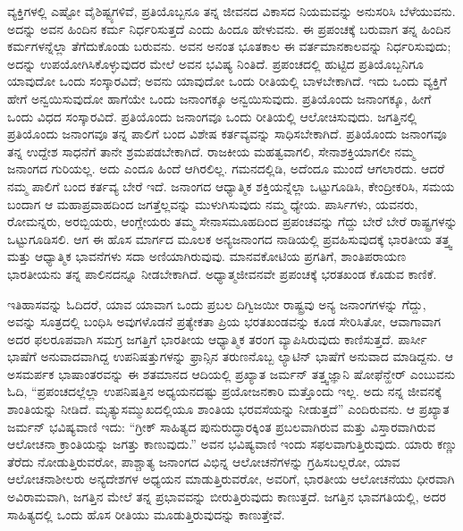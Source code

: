 ವ್ಯಕ್ತಿಗಳಲ್ಲಿ ಎಷ್ಟೋ ವೈಶಿಷ್ಟ್ಯಗಳಿವೆ, ಪ್ರತಿಯೊಬ್ಬನೂ ತನ್ನ ಜೀವನದ ವಿಕಾಸದ ನಿಯಮವನ್ನು ಅನುಸರಿಸಿ ಬೆಳೆಯುವನು. ಅದನ್ನು ಅವನ ಹಿಂದಿನ ಕರ್ಮ ನಿರ್ಧರಿಸು\-ತ್ತದೆ ಎಂದು ಹಿಂದೂ ಹೇಳುವನು. ಈ ಪ್ರಪಂಚಕ್ಕೆ ಬರುವಾಗ ತನ್ನ ಹಿಂದಿನ ಕರ್ಮಗಳನ್ನೆಲ್ಲಾ ತೆಗೆದುಕೊಂಡು ಬರುವನು. ಅವನ ಅನಂತ ಭೂತಕಾಲ ಈ ವರ್ತಮಾನಕಾಲವನ್ನು ನಿರ್ಧರಿಸುವುದು; ಅದನ್ನು ಉಪಯೋಗಿಸಿಕೊಳ್ಳುವುದರ ಮೇಲೆ ಅವನ ಭವಿಷ್ಯ ನಿಂತಿದೆ. ಪ್ರಪಂಚದಲ್ಲಿ ಹುಟ್ಟಿದ ಪ್ರತಿಯೊಬ್ಬನಿಗೂ ಯಾವುದೋ ಒಂದು ಸಂಸ್ಕಾರವಿದೆ; ಅವನು ಯಾವುದೋ ಒಂದು ರೀತಿಯಲ್ಲಿ ಬಾಳಬೇಕಾಗಿದೆ. ಇದು ಒಂದು ವ್ಯಕ್ತಿಗೆ ಹೇಗೆ ಅನ್ವಯಿಸುವುದೋ ಹಾಗೆಯೇ ಒಂದು ಜನಾಂಗಕ್ಕೂ ಅನ್ವಯಿಸುವುದು. ಪ್ರತಿಯೊಂದು ಜನಾಂಗಕ್ಕೂ, ಹೀಗೆ ಒಂದು ವಿಧದ ಸಂಸ್ಕಾರವಿದೆ. ಪ್ರತಿಯೊಂದು ಜನಾಂಗವೂ ಒಂದು ರೀತಿಯಲ್ಲಿ ಆಲೋಚಿಸುವುದು. ಜಗತ್ತಿನಲ್ಲಿ ಪ್ರತಿಯೊಂದು ಜನಾಂಗವೂ ತನ್ನ ಪಾಲಿಗೆ ಬಂದ ವಿಶೇಷ ಕರ್ತವ್ಯವನ್ನು ಸಾಧಿಸಬೇಕಾಗಿದೆ. ಪ್ರತಿಯೊಂದು ಜನಾಂಗವೂ ತನ್ನ ಉದ್ದೇಶ ಸಾಧನೆಗೆ ತಾನೇ ಶ್ರಮಪಡಬೇಕಾಗಿದೆ. ರಾಜಕೀಯ ಮಹತ್ವವಾಗಲಿ, ಸೇನಾಶಕ್ತಿಯಾಗಲೀ ನಮ್ಮ ಜನಾಂಗದ ಗುರಿಯಲ್ಲ. ಅದು ಎಂದೂ ಹಿಂದೆ ಆಗಿರಲಿಲ್ಲ. ಗಮನದಲ್ಲಿಡಿ, ಅದೆಂದೂ ಮುಂದೆ ಆಗಲಾರದು. ಆದರೆ ನಮ್ಮ ಪಾಲಿಗೆ ಬಂದ ಕರ್ತವ್ಯ ಬೇರೆ ಇದೆ. ಜನಾಂಗದ ಆಧ್ಯಾತ್ಮಿಕ ಶಕ್ತಿಯನ್ನೆಲ್ಲಾ ಒಟ್ಟುಗೂಡಿಸಿ, ಕೇಂದ್ರೀಕರಿಸಿ, ಸಮಯ ಬಂದಾಗ ಆ ಮಹಾಪ್ರವಾಹದಿಂದ ಜಗತ್ತೆಲ್ಲವನ್ನು ಮುಳುಗಿಸುವುದು ನಮ್ಮ ಧ್ಯೇಯ. ಪಾರ್ಸಿಗಳು, ಯವನರು, ರೋಮನ್ನರು, ಅರಬ್ಬಿಯರು, ಆಂಗ್ಲೇಯರು ತಮ್ಮ ಸೇನಾಸಮೂಹದಿಂದ ಪ್ರಪಂಚವನ್ನು ಗೆದ್ದು ಬೇರೆ ಬೇರೆ ರಾಷ್ಟ್ರಗಳನ್ನು ಒಟ್ಟುಗೂಡಿಸಲಿ. ಆಗ ಈ ಹೊಸ ಮಾರ್ಗದ ಮೂಲಕ ಅನ್ಯಜನಾಂಗದ ನಾಡಿಯಲ್ಲಿ ಪ್ರವಹಿಸುವುದಕ್ಕೆ ಭಾರತೀಯ ತತ್ತ್ವ ಮತ್ತು ಆಧ್ಯಾತ್ಮಿಕ ಭಾವನೆಗಳು ಸದಾ ಅಣಿಯಾಗಿರುವುವು. ಮಾನವಕೋಟಿಯ ಪ್ರಗತಿಗೆ, ಶಾಂತಿಪರಾಯಣ ಭಾರತೀಯನು ತನ್ನ ಪಾಲಿನದನ್ನೂ ನೀಡಬೇಕಾಗಿದೆ. ಅಧ್ಯಾತ್ಮಜೀವನವೇ ಪ್ರಪಂಚಕ್ಕೆ ಭರತಖಂಡ ಕೊಡುವ ಕಾಣಿಕೆ.

ಇತಿಹಾಸವನ್ನು ಓದಿದರೆ, ಯಾವ ಯಾವಾಗ ಒಂದು ಪ್ರಬಲ ದಿಗ್ವಿಜಯೀ ರಾಷ್ಟ್ರವು ಅನ್ಯ ಜನಾಂಗಗಳನ್ನು ಗೆದ್ದು, ಅವನ್ನು ಸೂತ್ರದಲ್ಲಿ ಬಂಧಿಸಿ ಅವುಗಳೊಡನೆ ಪ್ರತ್ಯೇಕತಾ ಪ್ರಿಯ ಭರತಖಂಡವನ್ನು ಕೂಡ ಸೇರಿಸಿತೋ, ಆವಾಗಾವಾಗ ಅದರ ಫಲರೂಪವಾಗಿ ಸಮಗ್ರ ಜಗತ್ತಿಗೆ ಭಾರತೀಯ ಆಧ್ಯಾತ್ಮಿಕ ತರಂಗ ವ್ಯಾಪಿಸಿರುವುದು ಕಾಣಿಸುತ್ತದೆ. ಪಾರ್ಸೀ ಭಾಷೆಗೆ ಅನುವಾದವಾಗಿದ್ದ ಉಪನಿಷತ್ತುಗಳನ್ನು ಫ್ರಾನ್ಸಿನ ತರುಣನೊಬ್ಬ ಲ್ಯಾಟಿನ್​ ಭಾಷೆಗೆ ಅನುವಾದ ಮಾಡಿದ್ದನು. ಆ ಅಸಮರ್ಪಕ ಭಾಷಾಂತರವನ್ನು ಈ ಶತಮಾನದ ಆದಿಯಲ್ಲಿ ಪ್ರಖ್ಯಾತ ಜರ್ಮನ್​ ತತ್ತ್ವಜ್ಞಾನಿ ಷೋಫೆನ್ಹೇರ್​ ಎಂಬುವನು ಓದಿ, “ಪ್ರಪಂಚದಲ್ಲೆಲ್ಲಾ ಉಪನಿಷತ್ತಿನ ಅಧ್ಯಯನದಷ್ಟು ಪ್ರಯೋಜನಕಾರಿ ಮತ್ತೊಂದು ಇಲ್ಲ. ಅದು ನನ್ನ ಜೀವನಕ್ಕೆ ಶಾಂತಿಯನ್ನು ನೀಡಿದೆ. ಮೃತ್ಯುಸಮ್ಮುಖದಲ್ಲಿಯೂ ಶಾಂತಿಯ ಭರವಸೆಯನ್ನು ನೀಡುತ್ತದೆ” ಎಂದಿರುವನು. ಆ ಪ್ರಖ್ಯಾತ ಜರ್ಮನ್​ ಭವಿಷ್ಯವಾಣಿ ಇದು: “ಗ್ರೀಕ್​ ಸಾಹಿತ್ಯದ ಪುನುರುದ್ಧಾರಕ್ಕಿಂತ ಪ್ರಬಲವಾಗಿರುವ ಮತ್ತು ವಿಸ್ತಾರವಾಗಿರುವ ಆಲೋಚನಾ ಕ್ರಾಂತಿಯನ್ನು ಜಗತ್ತು ಕಾಣುವುದು.” ಅವನ ಭವಿಷ್ಯವಾಣಿ ಇಂದು ಸಫಲವಾಗುತ್ತಿರುವುದು. ಯಾರು ಕಣ್ಣು ತೆರೆದು ನೋಡುತ್ತಿರುವರೋ, ಪಾಶ್ಚಾತ್ಯ ಜನಾಂಗದ ವಿಭಿನ್ನ ಆಲೋಚನೆ\-ಗಳನ್ನು ಗ್ರಹಿಸಬಲ್ಲರೋ, ಯಾವ ಆಲೋಚನಾಶೀಲರು ಅನ್ಯದೇಶಗಳ ಅಧ್ಯಯನ ಮಾಡುತ್ತಿರುವರೋ, ಅವರಿಗೆ, ಭಾರತೀಯ ಆಲೋಚನೆಯು ಧೀರವಾಗಿ ಅವಿರಾಮವಾಗಿ, ಜಗತ್ತಿನ ಮೇಲೆ ತನ್ನ ಪ್ರಭಾವವನ್ನು ಬೀರುತ್ತಿರುವುದು ಕಾಣುತ್ತದೆ. ಜಗತ್ತಿನ ಭಾವಗತಿಯಲ್ಲಿ, ಅದರ ಸಾಹಿತ್ಯದಲ್ಲಿ ಒಂದು ಹೊಸ ರೀತಿಯು ಮೂಡುತ್ತಿರುವುದನ್ನು ಕಾಣುತ್ತೇವೆ.

\vskip   4pt

